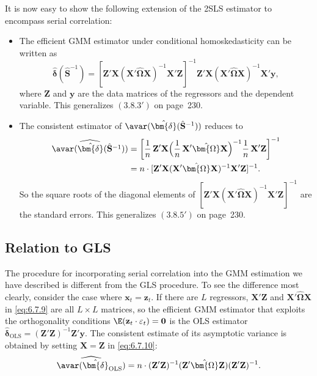 It is now easy to show the following extension of the 2SLS estimator to encompass
serial correlation:
\begin{itemize}
\item The efficient GMM estimator under conditional homoskedasticity can be written
as
\begin{equation}
  \hat{\bm{\delta}}(\hat{\mathbf{S}}^{-1})
  = [\mathbf{Z}'\mathbf{X}(\mathbf{X}'\hat{\bm{\Omega}}\mathbf{X})^{-1}\mathbf{X}'\mathbf{Z}]^{-1}
  \mathbf{Z}'\mathbf{X}(\mathbf{X}'\hat{\bm{\Omega}}\mathbf{X})^{-1}\mathbf{X}'\mathbf{y},
  \label{eq:6.7.9}
\end{equation}
where $\mathbf{Z}$ and $\mathbf{y}$ are the data matrices of the regressors and the dependent variable.
This generalizes $(3.8.3')$ on page~230.

\item The consistent estimator of $\avar(\hat{\bm{\delta}}(\hat{\mathbf{S}}^{-1}))$ reduces to
\begin{align}
  \widehat{\avar(\hat{\bm{\delta}}(\hat{\mathbf{S}}^{-1}))}
  &= \left[\frac{1}{n}\,\mathbf{Z}'\mathbf{X}
  \Bigl(\frac{1}{n}\,\mathbf{X}'\hat{\bm{\Omega}}\mathbf{X}\Bigr)^{-1}
  \frac{1}{n}\,\mathbf{X}'\mathbf{Z}\right]^{-1} \notag \\
  &= n \cdot [\mathbf{Z}'\mathbf{X}(\mathbf{X}'\hat{\bm{\Omega}}\mathbf{X})^{-1}\mathbf{X}'\mathbf{Z}]^{-1}.
  \label{eq:6.7.10}
\end{align}
So the square roots of the diagonal elements of $[\mathbf{Z}'\mathbf{X}(\mathbf{X}'\hat{\bm{\Omega}}\mathbf{X})^{-1}\mathbf{X}'\mathbf{Z}]^{-1}$ are the standard
errors. This generalizes $(3.8.5')$ on page~230.
\end{itemize}

\subsection*{Relation to GLS}

The procedure for incorporating serial correlation into the GMM estimation we
have described is different from the GLS procedure. To see the difference most
clearly, consider the case where $\mathbf{x}_t = \mathbf{z}_t$. If there are $L$ regressors, $\mathbf{X}'\mathbf{Z}$ and $\mathbf{X}'\hat{\bm{\Omega}}\mathbf{X}$
in \eqref{eq:6.7.9} are all $L \times L$ matrices, so the efficient GMM estimator that exploits the
orthogonality conditions $\E(\mathbf{z}_t \cdot \varepsilon_t) = \mathbf{0}$ is the OLS estimator $\hat{\bm{\delta}}_{\text{OLS}} = (\mathbf{Z}'\mathbf{Z})^{-1}\mathbf{Z}'\mathbf{y}$.
The consistent estimate of its asymptotic variance is obtained by setting $\mathbf{X} = \mathbf{Z}$ in
\eqref{eq:6.7.10}:
\begin{equation}
  \widehat{\avar(\hat{\bm{\delta}}_{\text{OLS}})}
  = n \cdot (\mathbf{Z}'\mathbf{Z})^{-1}(\mathbf{Z}'\hat{\bm{\Omega}}\mathbf{Z})(\mathbf{Z}'\mathbf{Z})^{-1}.
  \label{eq:6.7.11}
\end{equation}

